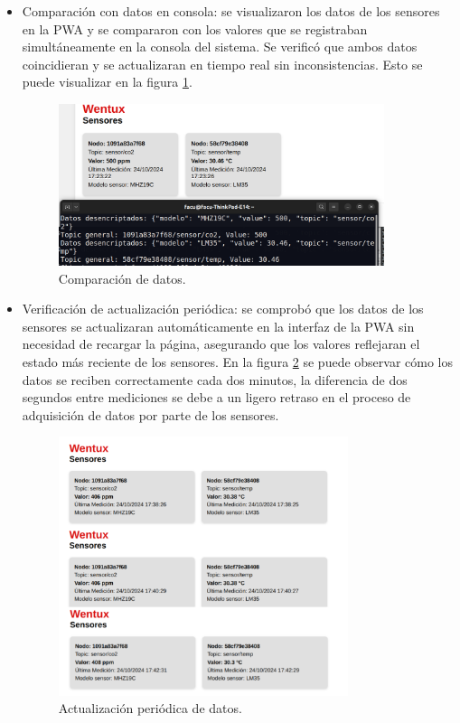 \begin{itemize}
    \item Comparación con datos en consola: se visualizaron los datos de los sensores en la PWA y se compararon con los valores que se registraban simultáneamente en la consola del sistema. Se verificó que ambos datos coincidieran y se actualizaran en tiempo real sin inconsistencias. Esto se puede visualizar en la figura \ref{fig:datos_s_ok}.
    
\begin{figure}[H]
\centering 
\includegraphics[width=0.9\textwidth]{./Figures/datos_sensores_ok.png}
\caption{Comparación de datos.}
\label{fig:datos_s_ok}
\end{figure}
    
    \item Verificación de actualización periódica: se comprobó que los datos de los sensores se actualizaran automáticamente en la interfaz de la PWA sin necesidad de recargar la página, asegurando que los valores reflejaran el estado más reciente de los sensores. En la figura \ref{fig:datos_p} se puede observar cómo los datos se reciben correctamente cada dos minutos, la diferencia de dos segundos entre mediciones se debe a un ligero retraso en el proceso de adquisición de datos por parte de los sensores.
    
    
\begin{figure}[H]
\centering 
\includegraphics[width=0.8\textwidth]{./Figures/datos_periodicos.png}
\caption{Actualización periódica de datos.}
\label{fig:datos_p}
\end{figure}
    
\end{itemize}

